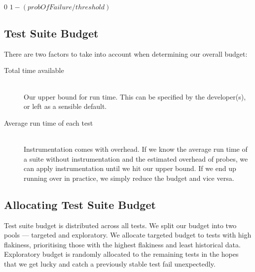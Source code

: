 {\begin{defn}[\Flakiness]
\end{defn}

\begin{algorithm}[h]
\caption{}
\label{alg:calculate_flakiness}

\begin{algorithmic}
	\Require{$probOfFailure$ and $threshold$ are decimal values within ranges
	$[0..1]$ and $(0..1]$ respectively.}
    \Statex


		\State \Return $0$
	\Else
		\State \Return $1 - (probOfFailure / threshold)$
	\EndIf

	\EndFunction
\end{algorithmic}

\end{algorithm}

\subsection{Test Suite Budget}
\label{sec:sec:budget}

There are two factors to take into account when determining our overall budget:

\begin{description}
	\item[Total time available] \hfill \\
 		Our upper bound for run time. This can be specified by the developer(s), or
 		left as a sensible default.
	\item[Average run time of each test] \hfill \\
		Instrumentation comes with overhead. If we know the average run time of a
		suite without instrumentation and the estimated overhead of probes, we can
		apply instrumentation until we hit our upper bound. If we end up running
		over in practice, we simply reduce the budget and vice versa.
\end{description}


\subsection{Allocating Test Suite Budget}
\label{sec:sec:allocating_budget}

Test suite budget is distributed across all tests. We split our budget into two
pools --- targeted and exploratory. We allocate targeted budget to tests with
high flakiness, prioritising those with the highest flakiness and least
historical data. Exploratory budget is randomly allocated to the remaining
tests in the hopes that we get lucky and catch a previously stable test fail
unexpectedly.

}
